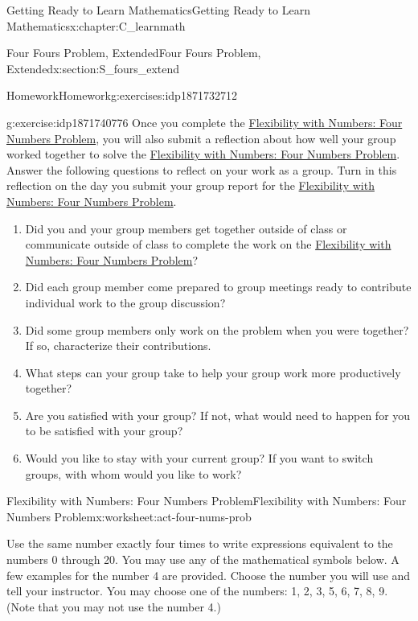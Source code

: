 \documentclass[oneside,10pt,]{book}
\numberwithin{equation}{chapter}
\begin{document}
\begin{chapterptx}{Getting Ready to Learn Mathematics}{}{Getting Ready to Learn Mathematics}{}{}{x:chapter:C_learnmath}
\begin{sectionptx}{Four Fours Problem, Extended}{}{Four Fours Problem, Extended}{}{}{x:section:S_fours_extend}
\begin{exercises-subsection}{Homework}{}{Homework}{}{}{g:exercises:idp1871732712}
\begin{divisionexercise}{4}{}{}{g:exercise:idp1871740776}%
Once you complete the \hyperref[x:worksheet:act-four-nums-prob]{Flexibility with Numbers: Four Numbers Problem}, you will also submit a reflection about how well your group worked together to solve the \hyperref[x:worksheet:act-four-nums-prob]{Flexibility with Numbers: Four Numbers Problem}. Answer the following questions to reflect on your work as a group. Turn in this reflection on the day you submit your group report for the \hyperref[x:worksheet:act-four-nums-prob]{Flexibility with Numbers: Four Numbers Problem}.%
\begin{enumerate}[font=\bfseries,label=(\alph*),ref=\alph*]
\item{}Did you and your group members get together outside of class or communicate outside of class to complete the work on the \hyperref[x:worksheet:act-four-nums-prob]{Flexibility with Numbers: Four Numbers Problem}?%
\item{}Did each group member come prepared to group meetings ready to contribute individual work to the group discussion?%
\item{}Did some group members only work on the problem when you were together? If so, characterize their contributions.%
\item{}What steps can your group take to help your group work more productively together?%
\item{}Are you satisfied with your group? If not, what would need to happen for you to be satisfied with your group?%
\item{}Would you like to stay with your current group? If you want to switch groups, with whom would you like to work?%
\end{enumerate}
\end{divisionexercise}%
\end{exercises-subsection}
%
%
\typeout{************************************************}
\typeout{************************************************}
%
\begin{worksheet-subsection}{Flexibility with Numbers: Four Numbers Problem}{}{Flexibility with Numbers: Four Numbers Problem}{}{}{x:worksheet:act-four-nums-prob}
\begin{introduction}{}%
Use the same number exactly four times to write expressions equivalent to the numbers 0 through 20. You may use any of the mathematical symbols below. A few examples for the number 4 are provided. Choose the number you will use and tell your instructor. You may choose one of the numbers: 1, 2, 3, 5, 6, 7, 8, 9. (Note that you may not use the number 4.)%

\end{introduction}
\end{worksheet-subsection}
\end{sectionptx}
\end{chapterptx}
\end{document}
